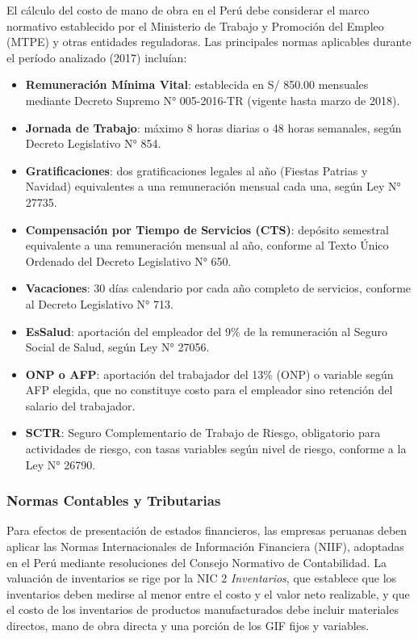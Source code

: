 \documentclass[
  stu,
  floatsintext,
  longtable,
  a4paper,
  nolmodern,
  notxfonts,
  notimes,
  12pt,
  colorlinks=true,linkcolor=blue,citecolor=blue,urlcolor=blue]{apa7}
\providecommand{\tightlist}{%
  \setlength{\itemsep}{0pt}\setlength{\parskip}{0pt}}
\begin{document}
El cálculo del costo de mano de obra en el Perú debe considerar el marco
normativo establecido por el Ministerio de Trabajo y Promoción del
Empleo (MTPE) y otras entidades reguladoras. Las principales normas
aplicables durante el período analizado (2017) incluían:

\begin{itemize}
\tightlist
\item
  \textbf{Remuneración Mínima Vital}: establecida en S/ 850.00 mensuales
  mediante Decreto Supremo N° 005-2016-TR (vigente hasta marzo de 2018).
\item
  \textbf{Jornada de Trabajo}: máximo 8 horas diarias o 48 horas
  semanales, según Decreto Legislativo N° 854.
\item
  \textbf{Gratificaciones}: dos gratificaciones legales al año (Fiestas
  Patrias y Navidad) equivalentes a una remuneración mensual cada una,
  según Ley N° 27735.
\item
  \textbf{Compensación por Tiempo de Servicios (CTS)}: depósito
  semestral equivalente a una remuneración mensual al año, conforme al
  Texto Único Ordenado del Decreto Legislativo N° 650.
\item
  \textbf{Vacaciones}: 30 días calendario por cada año completo de
  servicios, conforme al Decreto Legislativo N° 713.
\item
  \textbf{EsSalud}: aportación del empleador del 9\% de la remuneración
  al Seguro Social de Salud, según Ley N° 27056.
\item
  \textbf{ONP o AFP}: aportación del trabajador del 13\% (ONP) o
  variable según AFP elegida, que no constituye costo para el empleador
  sino retención del salario del trabajador.
\item
  \textbf{SCTR}: Seguro Complementario de Trabajo de Riesgo, obligatorio
  para actividades de riesgo, con tasas variables según nivel de riesgo,
  conforme a la Ley N° 26790.
\end{itemize}

\subsubsection{Normas Contables y
Tributarias}\label{normas-contables-y-tributarias}

Para efectos de presentación de estados financieros, las empresas
peruanas deben aplicar las Normas Internacionales de Información
Financiera (NIIF), adoptadas en el Perú mediante resoluciones del
Consejo Normativo de Contabilidad. La valuación de inventarios se rige
por la NIC 2 \emph{Inventarios}, que establece que los inventarios deben
medirse al menor entre el costo y el valor neto realizable, y que el
costo de los inventarios de productos manufacturados debe incluir
materiales directos, mano de obra directa y una porción de los GIF fijos
y variables.
\end{document}
